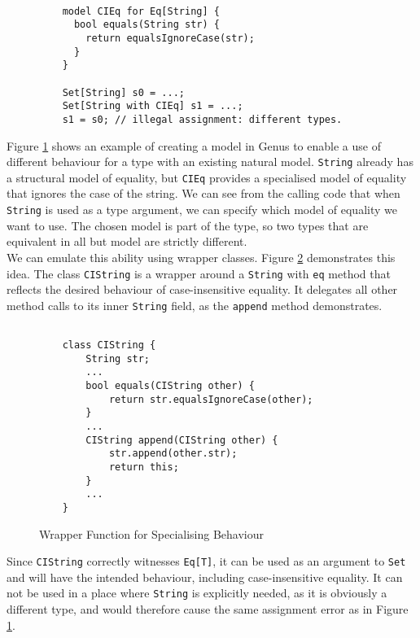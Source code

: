\begin{figure}[H]
    \centering
    \begin{verbatim}
    
    model CIEq for Eq[String] {
      bool equals(String str) {
        return equalsIgnoreCase(str);
      }
    }
    
    Set[String] s0 = ...;
    Set[String with CIEq] s1 = ...;
    s1 = s0; // illegal assignment: different types.
    \end{verbatim}
    \caption{}
    \label{fig:model-multiwitness}
\end{figure}

Figure \ref{fig:model-multiwitness} shows an example of creating a model in Genus to enable a use of different behaviour for a type with an existing natural model. \texttt{String} already has a structural model of equality, but \texttt{CIEq} provides a specialised model of equality that ignores the case of the string. We can see from the calling code that when \texttt{String} is used as a type argument, we can specify which model of equality we want to use. The chosen model is part of the type, so two types that are equivalent in all but model are strictly different. \\

We can emulate this ability using wrapper classes. Figure \ref{fig:class-multiwitness} demonstrates this idea. The class \texttt{CIString} is a wrapper around a \texttt{String} with \texttt{eq} method that reflects the desired behaviour of case-insensitive equality. It delegates all other method calls to its inner \texttt{String} field, as the \texttt{append} method demonstrates.

\begin{figure}[H]
    \centering
    \begin{verbatim}
    
    class CIString {
        String str;
        ...
        bool equals(CIString other) {
            return str.equalsIgnoreCase(other);
        }
        ...
        CIString append(CIString other) {
            str.append(other.str);
            return this;
        }
        ...
    }
    \end{verbatim}
    \caption{Wrapper Function for Specialising Behaviour}
    \label{fig:class-multiwitness}
\end{figure}

Since \texttt{CIString} correctly witnesses \texttt{Eq[T]}, it can be used as an argument to \texttt{Set} and will have the intended behaviour, including case-insensitive equality. It can not be used in a place where \texttt{String} is explicitly needed, as it is obviously a different type, and would therefore cause the same assignment error as in Figure \ref{fig:model-multiwitness}. \\

